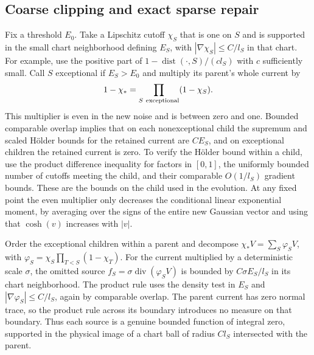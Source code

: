 \documentclass[11pt]{article}
\newcommand{\1}{\mathbf{1}}
\numberwithin{equation}{section}
\newcommand{\Div}{\operatorname{div}}
\begin{document}
\subsection{Coarse clipping and exact sparse repair}

Fix a threshold \(E_0\). Take a Lipschitz cutoff \(\chi_S\)
that is one on \(S\) and is supported in the small chart
neighborhood defining \(E_S\), with
\(|\nabla\chi_S|\le C/l_S\) in that chart. For example, use
the positive part of \(1-\operatorname{dist}(\cdot,S)/(c l_S)\)
with \(c\) sufficiently small. Call \(S\) exceptional if
\(E_S>E_0\) and multiply its parent's whole current by
\[
  1-\chi_*=\prod_{S\ {\rm exceptional}}(1-\chi_S).
\]
This multiplier is even in the new noise and is between zero
and one. Bounded comparable overlap implies that on each
nonexceptional child the supremum and scaled H\"older bounds
for the retained current are \(CE_S\), and on exceptional
children the retained current is zero. To verify the H\"older
bound within a child, use the product difference inequality
for factors in \([0,1]\), the uniformly bounded number of
cutoffs meeting the child, and their comparable
\(O(1/l_S)\) gradient bounds. These are the bounds on the child used in the evolution.
At any fixed point the even multiplier only decreases the conditional
linear exponential moment, by averaging over the signs
of the entire new Gaussian vector and using that
\(\cosh(v)\) increases with \(|v|\).

Order the exceptional children within a parent and
decompose \(\chi_*V=\sum_S\varphi_S V\), with
\(\varphi_S=\chi_S\prod_{T<S}(1-\chi_T)\).
For the current multiplied by a deterministic scale \(\sigma\),
the omitted source \(f_S=\sigma\Div(\varphi_S V)\) is bounded
by \(C\sigma E_S/l_S\) in its chart neighborhood. The
product rule uses the density test in \(E_S\) and
\(|\nabla\varphi_S|\le C/l_S\), again by comparable overlap.
The parent current has zero normal trace, so the product
rule across its boundary introduces no measure on that
boundary. Thus each source is a genuine bounded
function of integral zero, supported in the physical
image of a chart ball of radius \(Cl_S\) intersected
with the parent.
\end{document}
